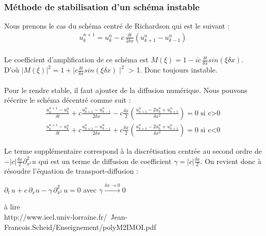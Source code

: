 \documentclass[12pt]{article}
\begin{document}
\subsubsection{Méthode de stabilisation d'un schéma instable}
\noindent Nous prenons le cas du schéma centré de Richardson qui est le suivant :
\begin{eqnarray*}
         u_k^{n+1} = u_k^n - c \, \frac{\delta t}{2\delta x}(u_{k+1}^n - u_{k-1}^n)
\end{eqnarray*}
\\
Le coefficient d’amplification de ce schéma est $M(\xi) = 1 - ic\,\displaystyle \frac{\delta t}{\delta x} sin(\xi \delta x)$.
\\D'où $|M(\xi)|^2 = 1 + \mid c\displaystyle\frac{\delta t}{\delta x} sin(\xi \delta x)\mid^2$ > 1. Donc toujours instable.\\\\
Pour le rendre stable, il faut ajouter de la diffusion numérique. Nous pouvons réécrire le schéma décentré comme suit :
\begin{eqnarray}
	\frac{u_k^{n+1} - u_k^n}{\delta t} + c\frac{u_{k+1}^n - u_{k-1}^n}{2\delta x}-c \frac{\delta x }{2}(\frac{u_{k+1}^n - 2u_{k}^n + u_{k+1}^n}{\delta x^2}) = 0 \text{ si c>0}
	\\\frac{u_k^{n+1} - u_k^n}{\delta t} + c\frac{u_{k+1}^n - u_{k-1}^n}{2\delta x}+c\frac{\delta x }{2}(\frac{u_{k+1}^n - 2u_k^n + u_{k+1}^n}{\delta x^2}) = 0 \text{ si c<0}
\end{eqnarray}

Le terme supplémentaire correspond à la discrétisation centrée au second ordre de $\displaystyle -|c|\frac{\delta x}{2}\partial_{x^2}^2 u$ qui est un terme de diffusion de coefficient $\displaystyle \gamma =  |c|\frac{\delta x}{2}.$ On revient donc à résoudre l'équation de transport-diffusion :
\begin{center}
   $\displaystyle \partial_t \,u + c\, \partial_x u - \gamma \, \partial_{x^2}^2 \, u = 0$ avec $\displaystyle \gamma \xrightarrow{\delta x \rightarrow 0} 0$ 
\end{center}

à lire
\\http://www.iecl.univ-lorraine.fr/~Jean-Francois.Scheid/Enseignement/polyM2IMOI.pdf
\end{document}
